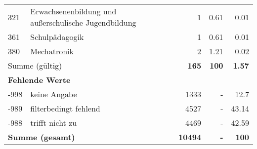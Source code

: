 \begin{longtable}{lXrrr}
        321 & \multicolumn{1}{X}{Erwachsenenbildung und außerschulische Jugendbildung} & %
          \num{1} &
          \num[round-mode=places,round-precision=2]{0,61} &
          \num[round-mode=places,round-precision=2]{0,01} \\

        361 & \multicolumn{1}{X}{Schulpädagogik} & %
          \num{1} &
          \num[round-mode=places,round-precision=2]{0,61} &
          \num[round-mode=places,round-precision=2]{0,01} \\

        380 & \multicolumn{1}{X}{Mechatronik} & %
          \num{2} &
          \num[round-mode=places,round-precision=2]{1,21} &
          \num[round-mode=places,round-precision=2]{0,02} \\

     \midrule
     \multicolumn{2}{l}{Summe (gültig)} &
       \textbf{\num{165}} &
     \textbf{100} &
       \textbf{\num[round-mode=places,round-precision=2]{1,57}} \\
     \multicolumn{5}{l}{\textbf{Fehlende Werte}}\\
       -998 &
       keine Angabe &
         \num{1333} &
        - &
         \num[round-mode=places,round-precision=2]{12,7} \\
       -989 &
       filterbedingt fehlend &
         \num{4527} &
        - &
         \num[round-mode=places,round-precision=2]{43,14} \\
       -988 &
       trifft nicht zu &
         \num{4469} &
        - &
         \num[round-mode=places,round-precision=2]{42,59} \\
     \midrule
     \multicolumn{2}{l}{\textbf{Summe (gesamt)}} &
          \textbf{\num{10494}} &
        \textbf{-} &
        \textbf{100} \\
     \bottomrule
     \end{longtable}
     
